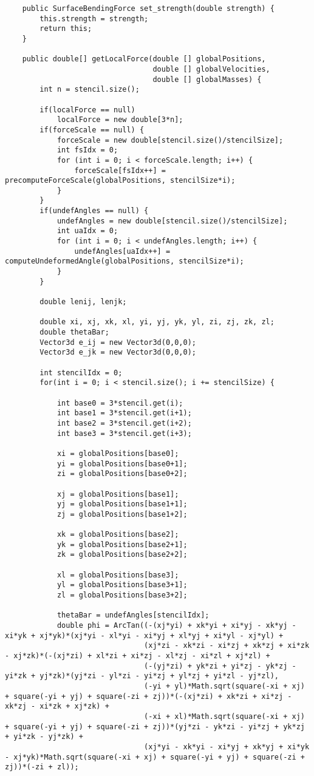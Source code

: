 \begin{lstlisting}
    public SurfaceBendingForce set_strength(double strength) {
		this.strength = strength;
		return this;
    }
	
	public double[] getLocalForce(double [] globalPositions,
								  double [] globalVelocities,
								  double [] globalMasses) {
		int n = stencil.size();
		
		if(localForce == null)
			localForce = new double[3*n];
		if(forceScale == null) {
			forceScale = new double[stencil.size()/stencilSize];
			int fsIdx = 0;
			for (int i = 0; i < forceScale.length; i++) {
				forceScale[fsIdx++] = precomputeForceScale(globalPositions, stencilSize*i);
			}
		}
		if(undefAngles == null) {
			undefAngles = new double[stencil.size()/stencilSize];
			int uaIdx = 0;
			for (int i = 0; i < undefAngles.length; i++) {
				undefAngles[uaIdx++] = computeUndeformedAngle(globalPositions, stencilSize*i);
			}
		}
		
		double lenij, lenjk;
		
		double xi, xj, xk, xl, yi, yj, yk, yl, zi, zj, zk, zl;
		double thetaBar;
		Vector3d e_ij = new Vector3d(0,0,0);
		Vector3d e_jk = new Vector3d(0,0,0);
		
		int stencilIdx = 0;
		for(int i = 0; i < stencil.size(); i += stencilSize) {
				
			int base0 = 3*stencil.get(i);
			int base1 = 3*stencil.get(i+1);
			int base2 = 3*stencil.get(i+2);
			int base3 = 3*stencil.get(i+3);
		
			xi = globalPositions[base0];
			yi = globalPositions[base0+1];
			zi = globalPositions[base0+2];
			
			xj = globalPositions[base1];
			yj = globalPositions[base1+1];
			zj = globalPositions[base1+2];
			
			xk = globalPositions[base2];
			yk = globalPositions[base2+1];
			zk = globalPositions[base2+2];
			
			xl = globalPositions[base3];
			yl = globalPositions[base3+1];
			zl = globalPositions[base3+2];
			
			thetaBar = undefAngles[stencilIdx];
			double phi = ArcTan((-(xj*yi) + xk*yi + xi*yj - xk*yj - xi*yk + xj*yk)*(xj*yi - xl*yi - xi*yj + xl*yj + xi*yl - xj*yl) + 
								(xj*zi - xk*zi - xi*zj + xk*zj + xi*zk - xj*zk)*(-(xj*zi) + xl*zi + xi*zj - xl*zj - xi*zl + xj*zl) + 
								(-(yj*zi) + yk*zi + yi*zj - yk*zj - yi*zk + yj*zk)*(yj*zi - yl*zi - yi*zj + yl*zj + yi*zl - yj*zl),
								(-yi + yl)*Math.sqrt(square(-xi + xj) + square(-yi + yj) + square(-zi + zj))*(-(xj*zi) + xk*zi + xi*zj - xk*zj - xi*zk + xj*zk) + 
								(-xi + xl)*Math.sqrt(square(-xi + xj) + square(-yi + yj) + square(-zi + zj))*(yj*zi - yk*zi - yi*zj + yk*zj + yi*zk - yj*zk) + 
								(xj*yi - xk*yi - xi*yj + xk*yj + xi*yk - xj*yk)*Math.sqrt(square(-xi + xj) + square(-yi + yj) + square(-zi + zj))*(-zi + zl));


\end{lstlisting}
